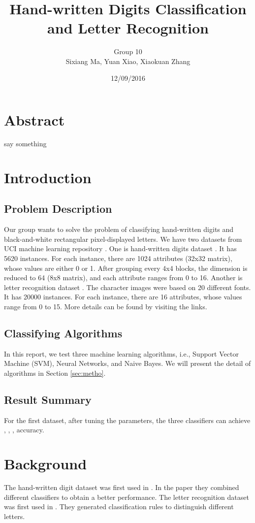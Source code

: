 \documentclass[11pt]{article}
\title{Hand-written Digits Classification and Letter Recognition}
\author{Group 10 \\ Sixiang Ma, Yuan Xiao, Xiaokuan Zhang}
\date{12/09/2016}
\begin{document}
\maketitle
\section*{Abstract}
say something

\section{Introduction}

\subsection{Problem Description}
Our group wants to solve the problem of classifying hand-written digits and  black-and-white rectangular pixel-displayed letters. We have two datasets from UCI machine learning repository \cite{Lichman2013}. One is hand-written digits dataset \cite{digitdataset}. It has 5620 instances. For each instance, there are 1024 attributes (32x32 matrix), whose values are either 0 or 1. After grouping every 4x4 blocks, the dimension is reduced to 64 (8x8 matrix), and each attribute ranges from 0 to 16. Another is letter recognition dataset \cite{letterdataset}. The character images were based on 20 different fonts. It has 20000 instances. For each instance, there are 16 attributes, whose values range from 0 to 15. More details can be found by visiting the links.

\subsection{Classifying Algorithms}
In this report, we test three machine learning  algorithms, i.e., Support Vector Machine (SVM), Neural Networks, and Naive Bayes. We will present the detail of algorithms in Section \ref{sec:metho}.
\subsection{Result Summary}
For the first dataset, after tuning the parameters, the three classifiers can achieve , , , accuracy. 

\section{Background}
The hand-written digit dataset was first used in \cite{kaynak1995methods}. In the paper they combined different classifiers to obtain a better performance.  The letter recognition dataset was first used in \cite{frey1991letter}. They generated classification rules to distinguish different letters.
\end{document}
